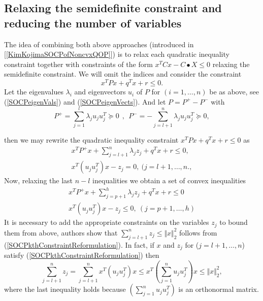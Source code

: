 \documentclass[12pt]{book}
\theoremstyle{definition}
\begin{document}
%


\subsection{Relaxing the semidefinite constraint and reducing the number of variables}

The idea of combining both above approaches (introduced in [\ref{KimKojimaSOCPofNoncvxQOP}]) is to relax each 
quadratic inequality constraint together with constraints of the form $x^TCx-C\bullet X \leq 0$ relaxing the semidefinite constraint. We will omit the indices and consider the constraint
\begin{equation}
\label{SOCPsingleQconst}
x^TPx + q^Tx + r\leq 0.
\end{equation}
Let the eigenvalues $\lambda_i$ and eigenvectors $u_i$ of $P$ for $(i = 1,\dots ,n)$ be as above, see (\ref{SOCPeigenVals}) and (\ref{SOCPeigenVects}). And let $ P = P^+ - P^-$ with 
\begin{equation}
P^+ = \sum_{j = 1}^{l}\lambda_j u_ju_j^T\succeq 0 \ \ , \ \ P^-  = -\sum_{j = l+1}^{n}\lambda_j u_ju_j^T\succeq 0,
\end{equation}

then we may rewrite the quadratic inequality constraint $x^TPx + q^Tx + r \leq 0$ as 
\begin{equation}
\begin{array}{l}
\label{SOCPkthConstraintReformulation}
x^TP^+x + \sum_{j = l + 1}^n \lambda_j z_j + q^Tx + r \leq 0, \\
x^T(u_ju_j^T)x - z_j = 0, \ ( j= l+1, \dots ,n., 
\end{array}
\end{equation}
Now, relaxing the last $n-l$ inequalities we obtain a set of convex inequalities 
\begin{equation}
\begin{array}{l}
\label{SOCPrelax2}
x^TP^+x + \sum_{j = p + 1}^h \lambda_j z_j + q^Tx + r \leq 0 \\
x^T(u_ju_j^T)x - z_j \leq 0, \ ( j= p+1, \dots ,h) 
\end{array}
\end{equation}
It is necessary to add the appropriate constraints on the variables $z_j$ to bound them from above, authors 
show that $\sum_{j=l+1}^n z_j \leq \Vert x\Vert_2^2$ follows from (\ref{SOCPkthConstraintReformulation}). 
In fact, if $x$ and $z_j$ for ($j = l+1,\dots ,n$) satisfy (\ref{SOCPkthConstraintReformulation})
then 
\begin{equation}
\sum_{j=l+1}^n z_j = \sum_{j=l+1}^nx^T(u_ju_j^T)x \leq  x^T \left(\sum_{j=1}^nu_ju_j^T\right)x \leq \Vert x\Vert_2^2,
\end{equation}
where the last inequality holds because $\left(\sum_{j=1}^nu_ju_j^T\right)$ is an orthonormal matrix.
\end{document}
